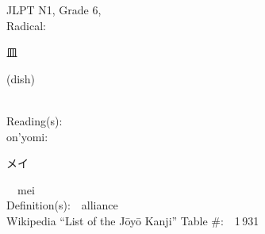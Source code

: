 \begin{multicols}{2}
{JLPT N1, Grade 6, \\Radical:\ \ {\begin{CJK}{UTF8}{min} 皿 \end{CJK}} (dish) } \\
Reading(s):\ \ \\
{\hspace*{1em}}on'yomi:\ \ \\
{\hspace*{2em}}{\begin{CJK}{UTF8}{min} メイ \end{CJK}}\ \ mei\ \ \\
Definition(s):\ \ alliance \\
Wikipedia ``List of the J\=oy\=o Kanji'' Table \#:\ \ 1\,931 \\
\ \ \\
\end{multicols}



